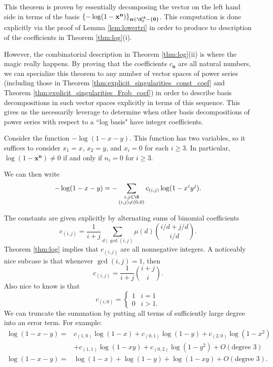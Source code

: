\documentclass[12pt]{amsart}
\newenvironment{BOXexample}{
\begin{exbox}\mbox{}
\begin{example}
}
{
\end{example}
\end{exbox}
}
\theoremstyle{plain}
\begin{document}
This theorem is proven by essentially decomposing the vector on the left hand side in terms of the basis $\{-\log(1-\mathbf{x}^{\mathbf{n}})\}_{\mathbf{n}\in\N^\N_0-\{\mathbf{0}\}}$. This computation is done explicitly via the proof of Lemma \ref{lem:lowertri} in order to produce to description of the coefficients in Theorem \ref{thm:log}(i).

However, the combinatorial description in Theorem \ref{thm:log}(ii) is where the magic really happens. By proving that the coefficients $c_{\mathbf{n}}$ are all natural numbers, we can specialize this theorem to any number of vector spaces of power series (including those in Theorem \ref{thm:explicit_singularities_const_coef} and Theorem \ref{thm:explicit_singularities_Frob_coef}) in order to describe basis decompositions in such vector spaces explicitly in terms of this sequence. This gives us the necessarily leverage to determine when other basis decompositions of power series with respect to a ``log basis" have integer coefficients.

\begin{BOXexample}
    Consider the function $-\log(1-x-y)$. This function has two variables, so it suffices to consider $x_1=x$, $x_2=y$, and $x_i = 0$ for each $i\ge 3$. In particular, $\log(1-\mathbf{x}^{\mathbf{n}}) \ne 0$ if and only if $n_i=0$ for $i\ge 3$.

    We can then write
    \[
    -\log(1-x-y) = -\sum_{\substack{i,j\in\N\\(i,j)\ne (0,0)}} c_{(i,j)}\log(1-x^iy^j).
    \]

    The constants are given explicitly by alternating sums of binomial coefficients
    \[
    c_{(i,j)} = \frac{1}{i+j} \sum_{d\mid \gcd(i,j)} \mu(d){i/d+j/d \choose i/d}.
    \]
    Theorem \ref{thm:log} implies that $c_{(i,j)}$ are all nonnegative integers. A noticeably nice subcase is that whenever $\gcd(i,j)=1$, then
    \[
    c_{(i,j)} = \frac{1}{i+j}{i+j\choose i}.
    \]
    Also nice to know is that
    \[
    c_{(i,0)} = \begin{cases}
        1 & i=1\\
        0 & i > 1.
    \end{cases}
    \]
    We can truncate the summation by putting all terms of sufficiently large degree into an error term. For example:
    \begin{align*}
    \log(1-x-y) =& c_{(1,0)}\log(1-x) + c_{(0,1)} \log(1-y) + c_{(2,0)}\log(1-x^2)\\
    &+ c_{(1,1)}\log(1-xy) + c_{(0,2)}\log(1-y^2) + O(\text{degree }3)\\
    \log(1-x-y)=&\log(1-x) + \log(1-y) + \log(1-xy) + O(\text{degree }3).\\
    \end{align*}
\end{BOXexample}
\end{document}
